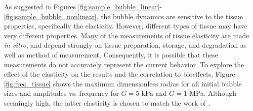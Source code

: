 As suggested in
Figures \ref{fig:sample_bubble_linear}-\ref{fig:sample_bubble_nonlinear},
the bubble dynamics are sensitive to the tissue properties,
specifically the elasticity. However, different types of tissue may
have very different properties. Many of the measurements of tissue elasticity are made
\emph{in vitro}, and depend strongly on tissue preparation, storage,
and degradation as well as method of measurement.  Consequently, it is
possible that these measurements do not accurately represent the
current behavior.  To explore the effect of the elasticity on the
results and the correlation to bioeffects, Figure \ref{fig:freq_tissue}
shows the maximum dimensionless radius for all initial bubble sizes
and amplitudes vs. frequency for $G=5$ kPa and $G=1$ MPa. Although
seemingly high, the latter elasticity is chosen to match the work of
\cite{Yang2005}.

